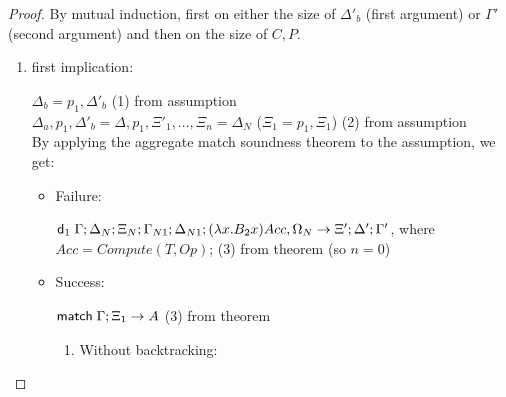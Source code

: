 \begin{proof}
   By mutual induction, first on either the size of $\Delta'_b$ (first argument) or $\Gamma'$ (second argument) and then on the size of $C, P$.
   
   \begin{enumerate}
      \item first implication:
      
      $\Delta_b = p_1, \Delta'_b$ \hfill (1) from assumption \\
      $\Delta_a, p_1, \Delta'_b = \Delta, p_1, \Xi'_1, ..., \Xi_n = \Delta_N$ ($\Xi_1 = p_1, \Xi_1$) \hfill (2) from assumption \\
      By applying the aggregate match soundness theorem to the assumption, we get:
      
      \begin{itemize}
         \item Failure:
         
         $\mathsf{d}_1 \; \Gamma; \Delta_N; \Xi_N; \Gamma_{N1}; \Delta_{N1}; (\lambda x. B_2 x)Acc, \Omega_N \rightarrow \Xi'; \Delta'; \Gamma'$, where $Acc = Compute(T, Op)$; \hfill (3) from theorem (so $n = 0$)\\
         
         \item Success:
         
         $\mathsf{match} \; \Gamma; \Xi_1 \rightarrow A$ \hfill (3) from theorem \\
         
         \begin{enumerate}
            \item Without backtracking:
            

\end{enumerate}
\end{itemize}
\end{enumerate}
\end{proof}
